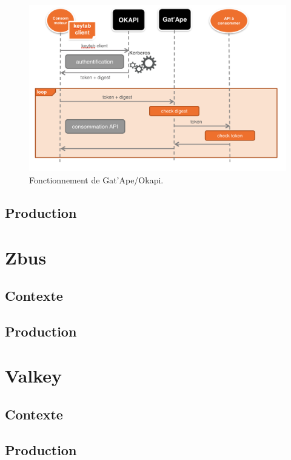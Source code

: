 \begin{figure}[htp]
  \centering
  \includegraphics[width=15cm]{images/gao/gao1}
  \caption{Fonctionnement de Gat'Ape/Okapi.}
  \label{fig:une-autre-image}
\end{figure}



\subsection{Production}



\section{Zbus}

\subsection{Contexte}

\subsection{Production}



\section{Valkey}

\subsection{Contexte}

\subsection{Production}

